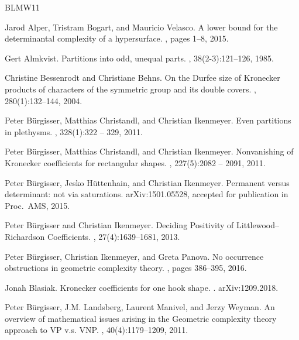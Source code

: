 \documentclass{article}
\numberwithin{equation}{section}
\theoremstyle{definition}
\begin{document}
\begin{thebibliography}{BLMW11}

Jarod Alper, Tristram Bogart, and Mauricio Velasco.
\newblock A lower bound for the determinantal complexity of a hypersurface.
, pages 1--8, 2015.

Gert Almkvist.
\newblock Partitions into odd, unequal parts.
, 38(2-3):121--126, 1985.

Christine Bessenrodt and Christiane Behns.
\newblock On the {D}urfee size of {K}ronecker products of characters of the
  symmetric group and its double covers.
, 280(1):132--144, 2004.

Peter B\"urgisser, Matthias Christandl, and Christian Ikenmeyer.
\newblock Even partitions in plethysms.
, 328(1):322 -- 329, 2011.

Peter B\"urgisser, Matthias Christandl, and Christian Ikenmeyer.
\newblock Nonvanishing of {K}ronecker coefficients for rectangular shapes.
, 227(5):2082 -- 2091, 2011.

Peter B\"urgisser, Jesko H\"uttenhain, and Christian Ikenmeyer.
\newblock Permanent versus determinant: not via saturations.
\newblock arXiv:1501.05528, accepted for publication in Proc.\ AMS, 2015.

Peter B{\"u}rgisser and Christian Ikenmeyer.
\newblock Deciding {P}ositivity of {L}ittlewood--{R}ichardson {C}oefficients.
, 27(4):1639--1681, 2013.

Peter B{\"u}rgisser, Christian Ikenmeyer, and Greta Panova.
\newblock No occurrence obstructions in geometric complexity theory.
, pages 386--395, 2016.

Jonah Blasiak.
\newblock Kronecker coefficients for one hook shape.
.
\newblock arXiv:1209.2018.

Peter B\"urgisser, J.M. Landsberg, Laurent Manivel, and Jerzy Weyman.
\newblock An overview of mathematical issues arising in the {G}eometric
  complexity theory approach to {VP} v.s. {VNP}.
, 40(4):1179--1209, 2011.


\end{thebibliography}
\end{document}
